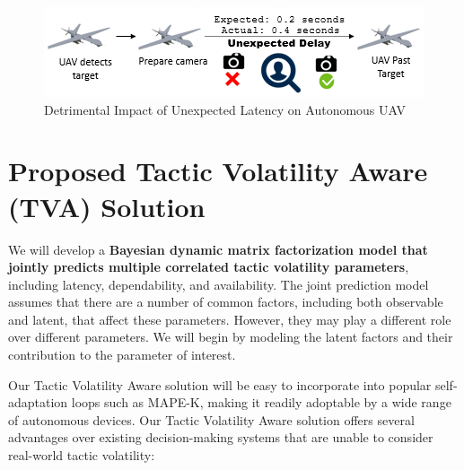 \documentclass{article}
\newcommand{\dan}[1]{\textcolor{blue}{{\it [Dan says: #1]}}}
\begin{document}

\begin{figure}[h]
	\centering
    \includegraphics[scale=0.85]{images/UAVLatencyExampleCamera.png}
    \caption{Detrimental Impact of Unexpected Latency on Autonomous UAV}
    \label{fig:UAVLatencyExampleCamera}
\end{figure}

\vspace{-5mm}
\section{Proposed Tactic Volatility Aware (TVA) Solution}

We will develop a {\bf Bayesian dynamic matrix factorization model that jointly predicts multiple correlated tactic volatility parameters}, including latency, dependability, and availability. The joint prediction model assumes that there are a number of common factors, including both observable and latent, that affect these parameters. However, they may play a different role over different parameters. We will begin by modeling the latent factors and their contribution to the parameter of interest. 




Our Tactic Volatility Aware solution will be easy to incorporate into popular self-adaptation loops such as MAPE-K, making it readily adoptable by a wide range of autonomous devices. Our Tactic Volatility Aware solution offers several advantages over existing decision-making systems that are unable to consider real-world tactic volatility:
\end{document}
